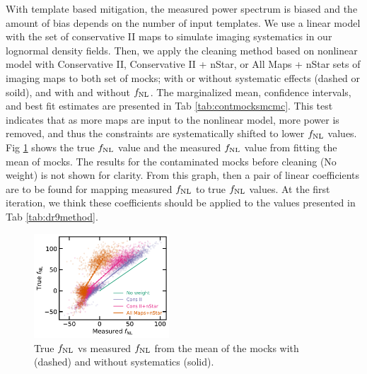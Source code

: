 With template based mitigation, the measured power spectrum is biased and the amount of bias depends on the number of input templates. We use a linear model with the set of conservative II maps to simulate imaging systematics in our lognormal density fields. Then, we apply the cleaning method based on nonlinear model with Conservative II, Conservative II + nStar, or All Maps + nStar sets of imaging maps to both set of mocks; with or without systematic effects (dashed or soild), and with and without $f_{\rm NL}$. The marginalized mean, confidence intervals, and best fit estimates are presented in Tab \ref{tab:contmocksmcmc}. This test indicates that as more maps are input to the nonlinear model, more power is removed, and thus the constraints are systematically shifted to lower $f_{\rm NL}$ values. Fig \ref{fig:fnlbias} shows the true $f_{\rm NL}$ value and the measured $f_{\rm NL}$ value from fitting the mean of mocks. The results for the contaminated mocks before cleaning (No weight) is not shown for clarity. From this graph, then a pair of linear coefficients are to be found for mapping measured $f_{\rm NL}$ to true $f_{\rm NL}$ values. At the first iteration, we think these coefficients should be applied to the values presented in Tab \ref{tab:dr9method}.


\begin{figure}
\centering
\includegraphics[width=0.45\textwidth]{figures/fnlbias}
\caption{True $f_{\rm NL}$ vs measured $f_{\rm NL}$ from the mean of the mocks with (dashed) and without systematics (solid).}\label{fig:fnlbias}
\end{figure}